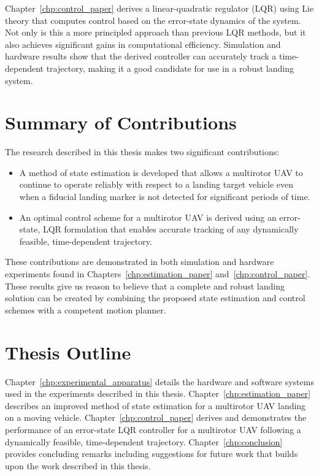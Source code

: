 Chapter~\ref{chp:control_paper} derives a
linear-quadratic regulator (LQR) using Lie theory that computes control based on
the error-state dynamics of the system. Not only is this a more principled
approach than previous LQR methods, but it also achieves significant gains in computational efficiency.
Simulation and hardware results show that the derived controller can accurately
track a time-dependent trajectory, making it a good candidate for use in a
robust landing system.

\section{Summary of Contributions}
The research described in this thesis makes two significant contributions:
\begin{itemize}
\item A method of state estimation is developed that allows a multirotor UAV to
  continue to operate reliably with respect to a landing target vehicle even when a
  fiducial landing marker is not detected for significant periods of time.
\item An optimal control scheme for a multirotor UAV is derived using an error-state,
  LQR formulation that enables accurate tracking of any dynamically feasible,
  time-dependent trajectory.
\end{itemize}

These contributions are demonstrated in both simulation and hardware
experiments found in Chapters~\ref{chp:estimation_paper}
and~\ref{chp:control_paper}. These results 
give us reason to believe that a
complete and robust landing solution can be created by combining the proposed
state estimation and control schemes with a competent motion planner.

\section{Thesis Outline}

Chapter~\ref{chp:experimental_apparatus} details the hardware and software
systems used
in the experiments described in this thesis.
Chapter~\ref{chp:estimation_paper}
describes an improved method of state estimation for a multirotor UAV landing on
a moving vehicle.
Chapter~\ref{chp:control_paper} derives and demonstrates the performance of
an error-state LQR controller for a
multirotor UAV following a dynamically feasible, time-dependent trajectory.
Chapter~\ref{chp:conclusion} provides concluding remarks including
suggestions for future work that builds upon the work described in this
thesis.
